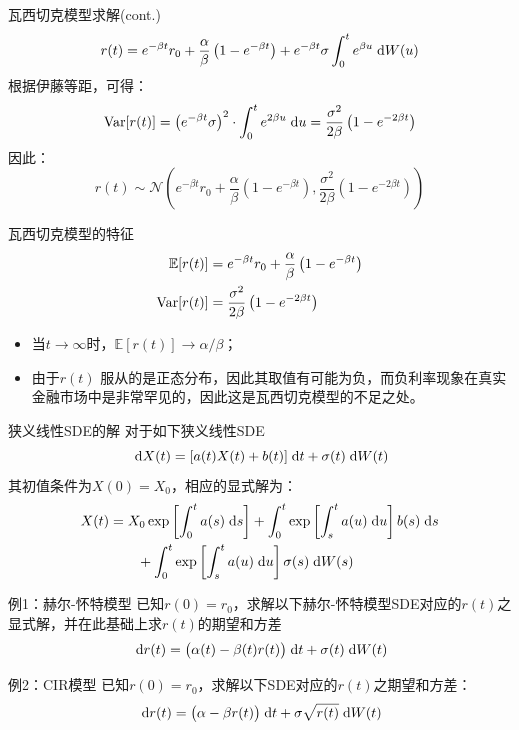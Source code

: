 \documentclass[t]{beamer}
\newcommand{\dif}{{\;\rm d}}
\newcommand{\E}{\mathbb{E}}
\newcommand{\Var}{{\rm Var}}
\begin{document}
\begin{frame}{瓦西切克模型求解(cont.)}
\[r(t)=e^{-\beta t}r_0+\frac{\alpha}{\beta}\left(1- e^{-\beta t}\right)+ e^{-\beta t}\sigma\int_{0}^t e^{\beta u}\dif W(u) \]
根据伊藤等距，可得：
\[\Var[r(t)]=\left(e^{-\beta t}\sigma \right)^2\cdot  \int_{0}^te^{2\beta u}\dif u=\frac{\sigma^2}{2\beta}\left(1-e^{-2\beta t} \right)  \]
因此：
\[r(t)\sim \mathcal{N}\left(e^{-\beta t}r_0+\frac{\alpha}{\beta}\left(1- e^{-\beta t}\right), \frac{\sigma^2}{2\beta}\left(1-e^{-2\beta t} \right) \right)  \]
\end{frame}

\begin{frame}{瓦西切克模型的特征}
\[\begin{split}
\E[r(t)]&=e^{-\beta t}r_0+\frac{\alpha}{\beta}\left(1- e^{-\beta t}\right) \\
\Var[r(t)]&=\frac{\sigma^2}{2\beta}\left(1-e^{-2\beta t} \right) 
\end{split} \]
\begin{itemize}
\item 当$t\to\infty$时，$\E[r(t)]\to \alpha/\beta$；
\item 由于$r(t)$
服从的是正态分布，因此其取值有可能为负，而负利率现象在真实金融市场中是非常罕见的，因此这是瓦西切克模型的不足之处。
\end{itemize}
\end{frame}

\begin{frame}{狭义线性SDE的解}
对于如下狭义线性SDE
\begin{equation*}
\dif X(t)=[a(t)X(t)+b(t)]\dif t+\sigma(t)\dif W(t)
\end{equation*}
其初值条件为$X(0)=X_0$，相应的显式解为：
\begin{equation*}
\begin{split}
X(t)&=X_0\exp\left[\int^t_0 a(s)\dif s\right]+\int^t_0\exp\left[\int^t_s a(u)\dif u\right]b(s)\dif s\\
&\qquad +\int^t_0\exp\left[\int^t_s a(u)\dif u\right]\sigma(s)\dif W(s)
\end{split}
\end{equation*}
\end{frame}

\begin{frame}{例1：赫尔-怀特模型}
已知$r(0)=r_0$，求解以下赫尔-怀特模型SDE对应的$r(t)$之显式解，并在此基础上求$r(t)$的期望和方差
\[\dif r(t)=\big(\alpha(t)-\beta(t) r(t)\big)\dif t+\sigma(t) \dif W(t)  \]
\end{frame}

\begin{frame}{例2：CIR模型}
已知$r(0)=r_0$，求解以下SDE对应的$r(t)$之期望和方差：
\[\dif r(t)=\big(\alpha-\beta r(t)\big)\dif t+\sigma\sqrt{r(t)} \dif W(t) \]
\end{frame}
\end{document}
